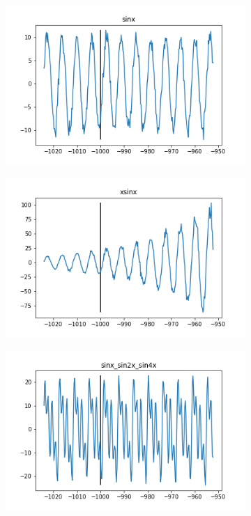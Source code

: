 \begin{figure}[ht]
    \centering
    \begin{subfigure}{0.45\textwidth}
        \includegraphics[width=\textwidth]{img/data_sinx.png}
    \end{subfigure}
    \begin{subfigure}{0.45\textwidth}
        \includegraphics[width=\textwidth]{img/data_xsinx.png}
    \end{subfigure}
    \begin{subfigure}{0.45\textwidth}
        \includegraphics[width=\textwidth]{img/data_sinx_sin2x_sin4x.png}

\end{subfigure}
\end{figure}
